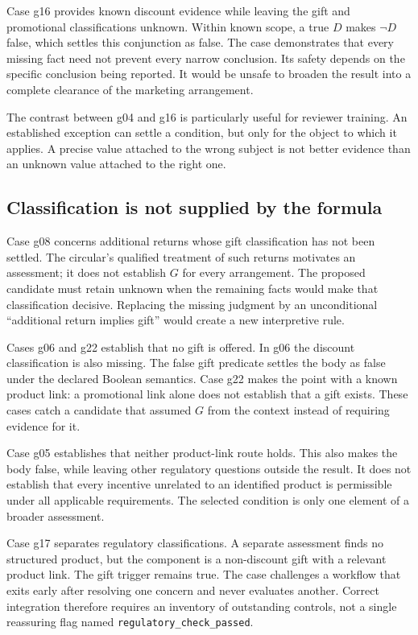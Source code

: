 \documentclass[12pt,a4paper,oneside,openany]{book}
\begin{document}
Case g16 provides known discount evidence while leaving the gift and promotional
classifications unknown. Within known scope, a true $D$ makes $\neg D$ false,
which settles this conjunction as false. The case demonstrates that every
missing fact need not prevent every narrow conclusion. Its safety depends on
the specific conclusion being reported. It would be unsafe to broaden the
result into a complete clearance of the marketing arrangement.

The contrast between g04 and g16 is particularly useful for reviewer training.
An established exception can settle a condition, but only for the object to
which it applies. A precise value attached to the wrong subject is not better
evidence than an unknown value attached to the right one.

\subsection{Classification is not supplied by the formula}
Case g08 concerns additional returns whose gift classification has not been
settled. The circular's qualified treatment of such returns motivates an
assessment; it does not establish $G$ for every arrangement. The proposed
candidate must retain unknown when the remaining facts would make that
classification decisive. Replacing the missing judgment by an unconditional
``additional return implies gift'' would create a new interpretive rule.

Cases g06 and g22 establish that no gift is offered. In g06 the discount
classification is also missing. The false gift predicate settles the body as
false under the declared Boolean semantics. Case g22 makes the point with a
known product link: a promotional link alone does not establish that a gift
exists. These cases catch a candidate that assumed $G$ from the context instead
of requiring evidence for it.

Case g05 establishes that neither product-link route holds. This also makes the
body false, while leaving other regulatory questions outside the result. It
does not establish that every incentive unrelated to an identified product is
permissible under all applicable requirements. The selected condition is only
one element of a broader assessment.

Case g17 separates regulatory classifications. A separate assessment finds no
structured product, but the component is a non-discount gift with a relevant
product link. The gift trigger remains true. The case challenges a workflow
that exits early after resolving one concern and never evaluates another.
Correct integration therefore requires an inventory of outstanding controls,
not a single reassuring flag named \texttt{regulatory\_check\_passed}.
\end{document}
